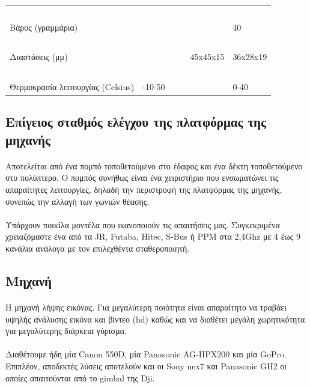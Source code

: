 \documentclass[a4paper, 12pt, twoside]{report}
\begin{document}
{{{{{{\begin{landscape}
\begin{longtable} { m{3cm} m{3cm} m{3cm} m{3cm} m{3cm} m{3cm} }
					\hdashline
					~\\
					Βάρος (γραμμάρια) & & & & & 40\\
					\hdashline
					~\\
					Διαστάσεις (μμ) & & & & 45x45x15 & 36x28x19\\
					\hdashline
					~\\
					Θερμοκρασία λειτουργίας (Celsius) & -10-50 & & & & 0-40\\
				\end{longtable}
				\end{landscape}
			
			
		\subsection{Επίγειος σταθμός ελέγχου της πλατφόρμας της μηχανής}
			\paragraph{}{Αποτελείται από ένα πομπό τοποθετούμενο στο έδαφος και ένα δέκτη τοποθετούμενο στο πολύπτερο. Ο πομπός συνήθως είναι ένα χειριστήριο που ενσωματώνει τις απαραίτητες λειτουργίες, δηλαδή την περιστροφή της πλατφόρμας της μηχανής, συνεπώς την αλλαγή των γωνιών θέασης.
			}
			\paragraph{}{Υπάρχουν ποικίλα μοντέλα που ικανοποιούν τις απαιτήσεις μας. Συγκεκριμένα χρειαζόμαστε ένα από τα JR, Futaba, Hitec, S-Bus ή PPM στα 2,4Ghz με 4 έως 9 κανάλια ανάλογα με τον επιλεχθέντα σταθεροποιητή.
			}
		
		\subsection{Μηχανή}
			\paragraph{}{Η μηχανή λήψης εικόνας. Για μεγαλύτερη ποιότητα είναι απαραίτητο να τραβάει υψηλής ανάλυσης εικόνα και βίντεο (hd) καθώς και να διαθέτει μεγάλη χωρητικότητα για μεγαλύτερης διάρκεια γύρισμα.
			}
			\paragraph{}{Διαθέτουμε ήδη μία Canon 550D, μία Panasonic AG-HPX200 και μία GoPro. Επιπλέον, αποδεκτές λύσεις αποτελούν και οι Sony nex7 και Panasonic GH2 οι οποίες απαιτούνται από το gimbal της Dji.
			}
		
}}}}}}
\end{document}
